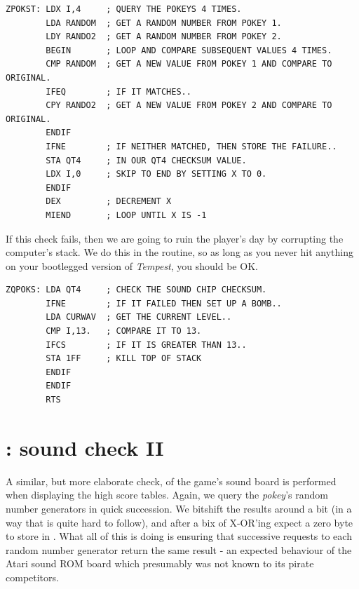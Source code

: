 \begin{lstlisting}
ZPOKST: LDX I,4     ; QUERY THE POKEYS 4 TIMES.
        LDA RANDOM  ; GET A RANDOM NUMBER FROM POKEY 1.
        LDY RANDO2  ; GET A RANDOM NUMBER FROM POKEY 2.
        BEGIN       ; LOOP AND COMPARE SUBSEQUENT VALUES 4 TIMES.
        CMP RANDOM  ; GET A NEW VALUE FROM POKEY 1 AND COMPARE TO ORIGINAL.
        IFEQ        ; IF IT MATCHES..
        CPY RANDO2  ; GET A NEW VALUE FROM POKEY 2 AND COMPARE TO ORIGINAL.
        ENDIF
        IFNE        ; IF NEITHER MATCHED, THEN STORE THE FAILURE..
        STA QT4     ; IN OUR QT4 CHECKSUM VALUE.
        LDX I,0     ; SKIP TO END BY SETTING X TO 0.
        ENDIF
        DEX         ; DECREMENT X
        MIEND       ; LOOP UNTIL X IS -1
\end{lstlisting}

If this check fails, then we are going to ruin the player's day by corrupting
the computer's stack. We do this in the  routine, so as long as you
never hit anything on your bootlegged version of \textit{Tempest}, you should be OK.

\begin{lstlisting}
ZQPOKS: LDA QT4     ; CHECK THE SOUND CHIP CHECKSUM.
        IFNE        ; IF IT FAILED THEN SET UP A BOMB..
        LDA CURWAV  ; GET THE CURRENT LEVEL..
        CMP I,13.   ; COMPARE IT TO 13.
        IFCS        ; IF IT IS GREATER THAN 13..
        STA 1FF     ; KILL TOP OF STACK
        ENDIF
        ENDIF
        RTS
\end{lstlisting}

\section*{: sound check II}

A similar, but more elaborate check, of the game's sound board is performed
when displaying the high score tables. Again, we query the \textit{pokey}'s random
number generators in quick succession. We bitshift the results around a bit (in a way that is quite
hard to follow), and after a bix of X-OR'ing expect a zero byte to store in .
What all of this is doing is ensuring that successive requests to each random number
generator return the same result - an expected behaviour of the Atari sound ROM board which
presumably was not known to its pirate competitors.

